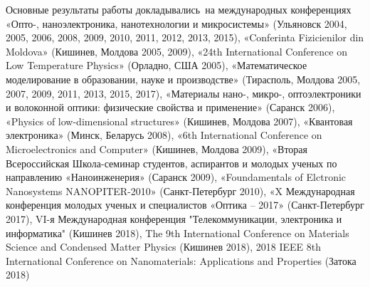 {\probation}
Основные результаты работы докладывались~на международных конференциях «Опто-, наноэлектроника, нанотехнологии и микросистемы» (Ульяновск 2004, 2005, 2006, 2008, 2009, 2010, 2011, 2012, 2013, 2015), «Conferinta Fizicienilor din Moldova» (Кишинев, Молдова 2005, 2009), «24th International Conference on Low Temperature Physics» (Орладно, США 2005), «Математическое моделирование в образовании, науке и производстве» (Тирасполь, Молдова 2005, 2007, 2009, 2011, 2013, 2015, 2017), «Материалы нано-, микро-, оптоэлектроники и волоконной оптики: физические свойства и применение» (Саранск 2006), «Physics of low-dimensional structures» (Кишинев, Молдова 2007), «Квантовая электроника» (Минск, Беларусь 2008), «6th International Conference on Microelectronics and Computer» (Кишинев, Молдова 2009), «Вторая Всероссийская Школа-семинар студентов, аспирантов и молодых ученых по направлению «Наноинженерия» (Саранск 2009), «Foundamentals of Elctronic Nanosystems NANOPITER-2010» (Санкт-Петербург 2010), «X Международная конференция молодых ученых и специалистов «Оптика – 2017» (Санкт-Петербург 2017), VI-я Международная конференция "Телекоммуникации, электроника и информатика" (Кишинев 2018), The 9th International Conference on Materials Science and Condensed Matter Physics (Кишинев 2018), 2018 IEEE 8th International Conference on Nanomaterials: Applications and Properties (Затока 2018)



